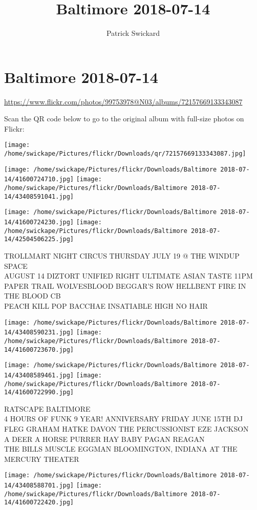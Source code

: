 \documentclass[10pt,letterpaper]{article}
\title{Baltimore 2018-07-14}
\author{Patrick Swickard}
\date{}
\begin{document}
\section*{Baltimore 2018-07-14}

\url{https://www.flickr.com/photos/99753978@N03/albums/72157669133343087}

Scan the QR code below to go to the original album with full-size photos on Flickr:

\texttt{[image: /home/swickape/Pictures/flickr/Downloads/qr/72157669133343087.jpg]}
\pagebreak

\texttt{[image: /home/swickape/Pictures/flickr/Downloads/Baltimore 2018-07-14/41600724710.jpg]}
\texttt{[image: /home/swickape/Pictures/flickr/Downloads/Baltimore 2018-07-14/43408591041.jpg]}

\texttt{[image: /home/swickape/Pictures/flickr/Downloads/Baltimore 2018-07-14/41600724230.jpg]}
\texttt{[image: /home/swickape/Pictures/flickr/Downloads/Baltimore 2018-07-14/42504506225.jpg]}

TROLLMART NIGHT CIRCUS THURSDAY JULY 19 @ THE WINDUP SPACE\\
AUGUST 14 DIZTORT UNIFIED RIGHT ULTIMATE ASIAN TASTE 11PM\\
PAPER TRAIL WOLVESBLOOD BEGGAR'S ROW HELLBENT FIRE IN THE BLOOD CB\\
PEACH KILL POP BACCHAE INSATIABLE HIGH NO HAIR
\pagebreak

\texttt{[image: /home/swickape/Pictures/flickr/Downloads/Baltimore 2018-07-14/43408590231.jpg]}
\texttt{[image: /home/swickape/Pictures/flickr/Downloads/Baltimore 2018-07-14/41600723670.jpg]}

\texttt{[image: /home/swickape/Pictures/flickr/Downloads/Baltimore 2018-07-14/43408589461.jpg]}
\texttt{[image: /home/swickape/Pictures/flickr/Downloads/Baltimore 2018-07-14/41600722990.jpg]}

RATSCAPE BALTIMORE\\
4 HOURS OF FUNK 9 YEAR! ANNIVERSARY FRIDAY JUNE 15TH DJ FLEG GRAHAM HATKE DAVON THE PERCUSSIONIST EZE JACKSON\\
A DEER A HORSE PURRER HAY BABY PAGAN REAGAN\\
THE BILLS MUSCLE EGGMAN BLOOMINGTON, INDIANA AT THE MERCURY THEATER
\pagebreak

\texttt{[image: /home/swickape/Pictures/flickr/Downloads/Baltimore 2018-07-14/43408588701.jpg]}
\texttt{[image: /home/swickape/Pictures/flickr/Downloads/Baltimore 2018-07-14/41600722420.jpg]}
\end{document}

